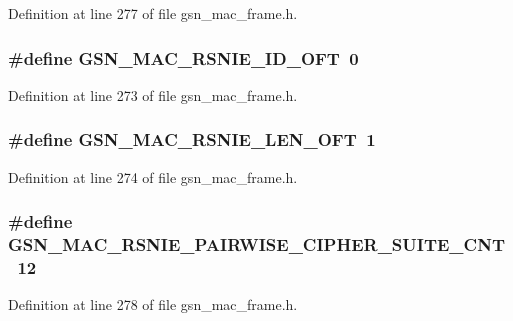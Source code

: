 Definition at line 277 of file gsn\_\-mac\_\-frame.h.

\hypertarget{a00523_adea512e51ea5790311491642a80775bb}{
\subsubsection[{GSN\_\-MAC\_\-RSNIE\_\-ID\_\-OFT}]{\setlength{\rightskip}{0pt plus 5cm}\#define GSN\_\-MAC\_\-RSNIE\_\-ID\_\-OFT~0}}
\label{a00523_adea512e51ea5790311491642a80775bb}


Definition at line 273 of file gsn\_\-mac\_\-frame.h.

\hypertarget{a00523_a42bd2cb33b92c35bb4a2c438d778b08b}{
\subsubsection[{GSN\_\-MAC\_\-RSNIE\_\-LEN\_\-OFT}]{\setlength{\rightskip}{0pt plus 5cm}\#define GSN\_\-MAC\_\-RSNIE\_\-LEN\_\-OFT~1}}
\label{a00523_a42bd2cb33b92c35bb4a2c438d778b08b}


Definition at line 274 of file gsn\_\-mac\_\-frame.h.

\hypertarget{a00523_a71b00668509235bb8a9bfb8d5db37350}{
\subsubsection[{GSN\_\-MAC\_\-RSNIE\_\-PAIRWISE\_\-CIPHER\_\-SUITE\_\-CNT}]{\setlength{\rightskip}{0pt plus 5cm}\#define GSN\_\-MAC\_\-RSNIE\_\-PAIRWISE\_\-CIPHER\_\-SUITE\_\-CNT~12}}
\label{a00523_a71b00668509235bb8a9bfb8d5db37350}


Definition at line 278 of file gsn\_\-mac\_\-frame.h.

